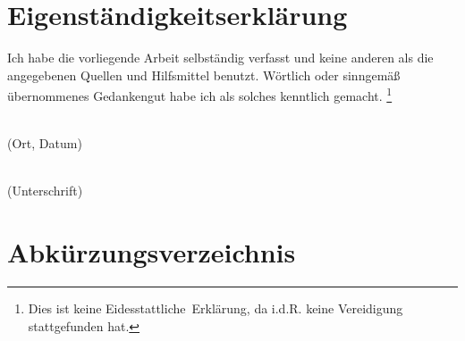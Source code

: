 \documentclass[ngerman,12pt]{article} %
\begin{document}
\clearpage





\section*{Eigenständigkeitserklärung}
Ich habe die vorliegende Arbeit selbständig verfasst und keine anderen als die angegebenen Quellen und Hilfsmittel benutzt.
Wörtlich oder sinngemäß übernommenes Gedankengut habe ich als solches kenntlich gemacht.
\footnote{
Dies ist keine \glqq Eidesstattliche\grqq\ Erklärung, da i.d.R. keine Vereidigung stattgefunden hat.}

\vspace*{3cm}\noindent
\parbox{6cm}{\hrulefill\\\centering(Ort, Datum)}
\hfill
\parbox{6cm}{\hrulefill\\\centering(Unterschrift)}
\clearpage





\tableofcontents %
\clearpage





\listoffigures %
\clearpage





\listoftables %
\clearpage





\section*{Abkürzungsverzeichnis} %
\end{document}
